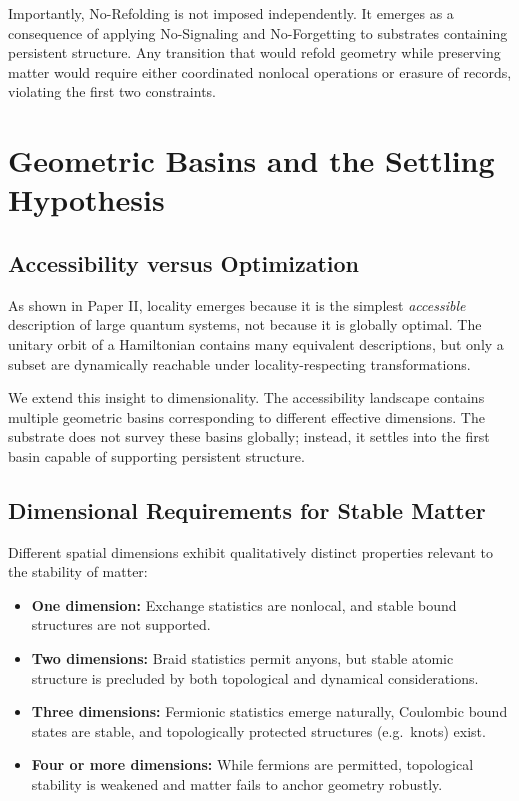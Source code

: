 \documentclass[11pt]{article}
\begin{document}
Importantly, No-Refolding is not imposed independently. It emerges as a consequence of applying No-Signaling and No-Forgetting to substrates containing persistent structure. Any transition that would refold geometry while preserving matter would require either coordinated nonlocal operations or erasure of records, violating the first two constraints.

\section{Geometric Basins and the Settling Hypothesis}

\subsection{Accessibility versus Optimization}

As shown in Paper II, locality emerges because it is the simplest \emph{accessible} description of large quantum systems, not because it is globally optimal. The unitary orbit of a Hamiltonian contains many equivalent descriptions, but only a subset are dynamically reachable under locality-respecting transformations.

We extend this insight to dimensionality. The accessibility landscape contains multiple geometric basins corresponding to different effective dimensions. The substrate does not survey these basins globally; instead, it settles into the first basin capable of supporting persistent structure.

\subsection{Dimensional Requirements for Stable Matter}

Different spatial dimensions exhibit qualitatively distinct properties relevant to the stability of matter:

\begin{itemize}
\item \textbf{One dimension:} Exchange statistics are nonlocal, and stable bound structures are not supported.
\item \textbf{Two dimensions:} Braid statistics permit anyons, but stable atomic structure is precluded by both topological and dynamical considerations.
\item \textbf{Three dimensions:} Fermionic statistics emerge naturally, Coulombic bound states are stable, and topologically protected structures (e.g.\ knots) exist.
\item \textbf{Four or more dimensions:} While fermions are permitted, topological stability is weakened and matter fails to anchor geometry robustly.
\end{itemize}
\end{document}
